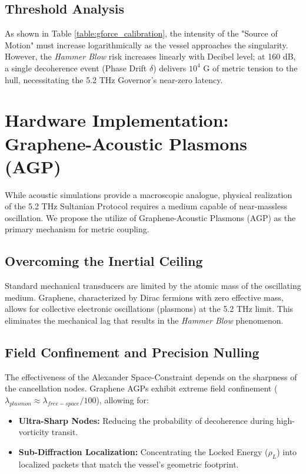 \documentclass[11pt,a4paper]{article}
\begin{document}
\subsection{Threshold Analysis}
As shown in Table \ref{table:gforce_calibration}, the intensity of the "Source of Motion" must increase logarithmically as the vessel approaches the singularity. However, the \textit{Hammer Blow} risk increases linearly with Decibel level; at 160 dB, a single decoherence event (Phase Drift $\delta$) delivers $10^4$ G of metric tension to the hull, necessitating the 5.2 THz Governor's near-zero latency.
\section{Hardware Implementation: Graphene-Acoustic Plasmons (AGP)}

While acoustic simulations provide a macroscopic analogue, physical realization of the 5.2 THz Sultanian Protocol requires a medium capable of near-massless oscillation. We propose the utilize of Graphene-Acoustic Plasmons (AGP) as the primary mechanism for metric coupling.

\subsection{Overcoming the Inertial Ceiling}
Standard mechanical transducers are limited by the atomic mass of the oscillating medium. Graphene, characterized by Dirac fermions with zero effective mass, allows for collective electronic oscillations (plasmons) at the 5.2 THz limit. This eliminates the mechanical lag that results in the \textit{Hammer Blow} phenomenon.

\subsection{Field Confinement and Precision Nulling}
The effectiveness of the Alexander Space-Constraint depends on the sharpness of the cancellation nodes. Graphene AGPs exhibit extreme field confinement ($\lambda_{plasmon} \approx \lambda_{free-space}/100$), allowing for:
\begin{itemize}
    \item \textbf{Ultra-Sharp Nodes:} Reducing the probability of decoherence during high-vorticity transit.
    \item \textbf{Sub-Diffraction Localization:} Concentrating the Locked Energy ($\rho_L$) into localized packets that match the vessel's geometric footprint.
\end{itemize}
\end{document}
